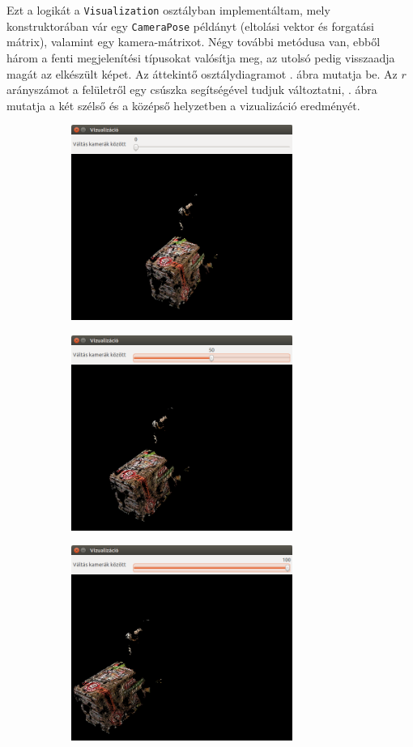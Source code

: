 Ezt a logikát a \texttt{Visualization} osztályban implementáltam, mely konstruktorában vár egy \texttt{CameraPose} példányt (eltolási vektor és forgatási mátrix), valamint egy kamera-mátrixot. Négy további metódusa van, ebből három a fenti megjelenítési típusokat valósítja meg, az utolsó pedig visszaadja magát az elkészült képet. Az áttekintő osztálydiagramot . ábra mutatja be. Az $r$ arányszámot a felületről egy csúszka segítségével tudjuk változtatni, . ábra mutatja a két szélső és a középső helyzetben a vizualizáció eredményét.

\begin{figure}[tbh]
\centering
\begin{subfigure}[b]{.49\linewidth}
	\centering
	\includegraphics[width=205pt]{figures/visu_pixels_left.png}
	\caption{}
  \end{subfigure}
\begin{subfigure}[b]{.49\linewidth}
	\centering
	\includegraphics[width=205pt]{figures/visu_pixels_center.png}
	\caption{}
  \end{subfigure}
\begin{subfigure}[b]{.49\linewidth}
	\centering
	\includegraphics[width=205pt]{figures/visu_pixels_right.png}

\end{subfigure}
\end{figure}
